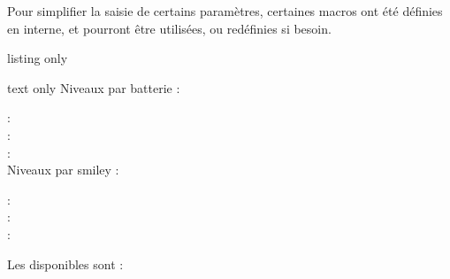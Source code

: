 \documentclass[french,11pt,a4paper]{article}
\begin{document}
Pour simplifier la saisie de certains paramètres, certaines macros ont été définies en interne, et pourront être utilisées, ou redéfinies si besoin.

\begin{DemoCode}{listing only}
\def\LabelNoteComp{Note}
\def\LstDeuxNiv{NA § A}
\def\LstTroisNiv{NA § ECA § A}
\def\LstQuatreNiv{NA § PA § ECA § A}
\def\NoticeDeuxNiv{Non acquis § Acquis}
\def\NoticeTroisNiv{Non acquis § En cours d'acquis. § Acquis}
\def\NoticeQuatreNiv{Non acquis § Part. acquis § En cours d'acquis. § Acquis}
\end{DemoCode}

\begin{DemoCode}{text only}
Niveaux par \og batterie \fg :

   : \DeuxNivBatterie\\
  : \TroisNivBatterie \\
 : \QuatreNivBatterie\\

Niveaux par \og smiley \fg :

     : \DeuxNivSmiley\\
    : \TroisNivSmiley\\
   : \QuatreNivSmiley
\end{DemoCode}

\pagebreak

Les  disponibles sont :
\end{document}
